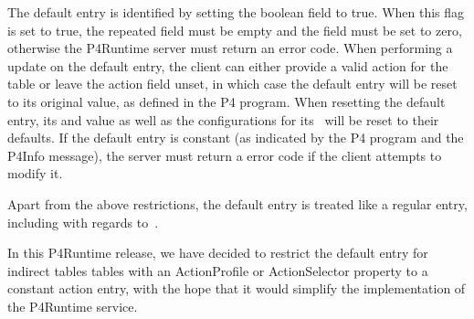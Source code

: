 \documentclass[11pt]{article}
\begin{document}
{%
The default entry is identified by setting the  boolean field
to true. When this flag is set to true, the repeated  field must be empty
and the  field must be set to zero, otherwise the P4Runtime server
must return an  error code. When performing a  update
on the default entry, the client can either provide a valid action for the table
or leave the action field unset, in which case the default entry will be reset
to its original value, as defined in the P4 program. When resetting the default
entry, its  and  value as well as the
configurations for its~ will be reset
to their defaults. If the default entry is constant (as indicated by the P4
program and the P4Info message), the server must return a 
error code if the client attempts to modify it.%

Apart from the above restrictions, the default entry is treated like a regular
entry, including with regards to~.%

In this P4Runtime release, we have decided to restrict the default entry for
indirect tables \textemdash{} tables with an ActionProfile or ActionSelector
 property \textemdash{} to a constant  action entry, with the
hope that it would simplify the implementation of the P4Runtime service.%

}
\end{document}
